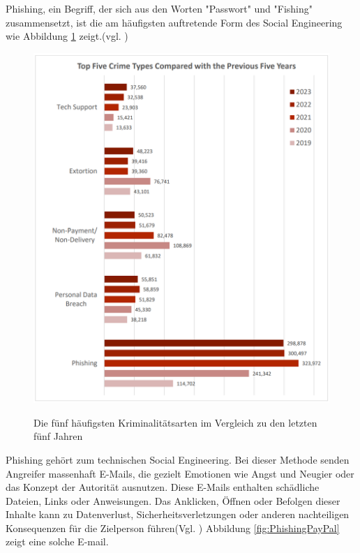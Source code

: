 Phishing, ein Begriff, der sich aus den Worten "Passwort" und "Fishing" zusammensetzt, ist die am häufigsten auftretende Form des Social Engineering wie Abbildung \ref{fig:CrimeVergleich} zeigt.(vgl. \cite{bsi1})

\begin{figure}[h]
    \centering
\includegraphics[width = 12cm]{figures/FBICrimeVergleich.png}
\caption{Die fünf häufigsten Kriminalitätsarten im Vergleich zu den letzten fünf Jahren}
\cite{fbi}
\label{fig:CrimeVergleich}
\end{figure}

Phishing gehört zum technischen Social Engineering. Bei dieser Methode senden Angreifer massenhaft E-Mails, die gezielt Emotionen wie Angst und Neugier oder das Konzept der Autorität ausnutzen. Diese E-Mails enthalten schädliche Dateien, Links oder Anweisungen. Das Anklicken, Öffnen oder Befolgen dieser Inhalte kann zu Datenverlust, Sicherheitsverletzungen oder anderen nachteiligen Konsequenzen für die Zielperson führen(Vgl. \cite{phishing}) Abbildung \ref{fig:PhishingPayPal} zeigt eine solche E-mail.


